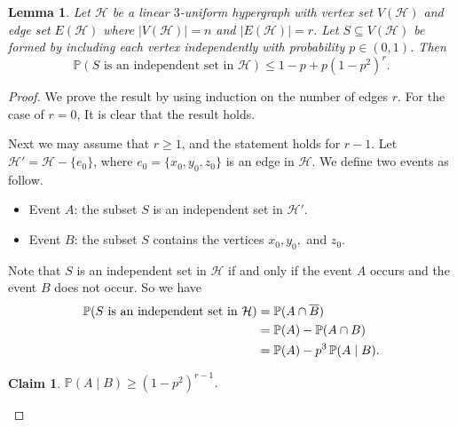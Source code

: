 \documentclass[10pt,a4paper]{amsart}
\newtheorem{lemma}{Lemma}
\newtheorem{claim}{Claim}
\newcommand{\cH}{\mathcal{H}}
\begin{document}
\begin{lemma}\label{lem:linear3}
Let $\cH$ be a linear $3$-uniform hypergraph with vertex set $V(\cH)$ and edge set $E(\cH)$ where $|V(\cH)| = n$ and $|E(\cH)| = r$. Let $S\subseteq V(\cH)$
be formed by including each vertex independently with probability $p\in(0,1)$. Then
$$
\mathbb P(S \text{ is an independent set in } \cH)\le 1-p+p(1-p^2)^r.
$$
\end{lemma}

\begin{proof}
We prove the result by using induction on the number of edges $r$.
For the case of $r = 0$, It is clear that the result holds. 

Next we may assume that $r\ge 1$, and the statement holds for $r-1$. 
 Let $\cH'= \cH -\{e_0\}$, where  $e_0=\{x_0,y_0,z_0\}$ is an edge in $ \cH$.
We  define two events as follow.
\begin{itemize}
\item Event $A$: the subset $S$  is an independent set in $\cH'$.
\item Event $B$: the subset $S$ contains the vertices $x_0,y_0,$ and $z_0$.
\end{itemize}
Note that $S$ is an independent set in $\cH$ if and only if the event $A$ occurs and the event $B$ does not occur. So we have
\begin{align}\label{S-ind}
\mathbb P(S \text{ is an independent set in } \cH)&=\mathbb P(A\cap \overline{B})\notag\\
&=\mathbb P(A)-\mathbb P(A\cap B)\notag\\
&=\mathbb P(A)-p^3\,\mathbb P(A\mid B).
\end{align}

\begin{claim}\label{cl:condtiona}
$\mathbb{P}(A\mid B)\ge (1-p^2)^{r-1}$.
\end{claim}


\end{proof}
\end{document}
